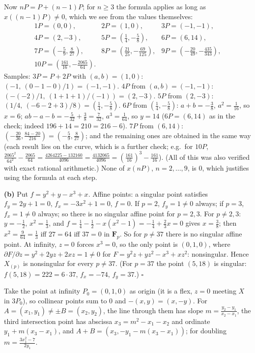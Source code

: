 \documentclass[11pt]{article}
\begin{document}
Now $nP=P+(n-1)P$; for $n\ge3$ the formula applies as long as $x((n-1)P)\neq0$, which we see from the values themselves:
\[
\begin{array}{lll}
1P=(0,0), & 2P=(1,0), & 3P=(-1,-1),\\
4P=(2,-3), & 5P=(\frac14,-\frac58), & 6P=(6,14),\\
7P=(-\frac59,\frac8{27}), & 8P=(\frac{21}{25},-\frac{69}{125}), & 9P=(-\frac{20}{49},-\frac{435}{343}),\\
10P=(\frac{161}{16},-\frac{2065}{64}). & &
\end{array}
\]
Samples: $3P=P+2P$ with $(a,b)=(1,0)$: $(-1,\ (0-1-0)/1)=(-1,-1)$. $4P$ from $(a,b)=(-1,-1)$: $(-(-2)/1,\ (1+1+1)/(-1))=(2,-3)$. $5P$ from $(2,-3)$: $(1/4,\ (-6-2+3)/8)=(\frac14,-\frac58)$. $6P$ from $(\frac14,-\frac58)$: $a+b=-\frac38$, $a^2=\frac1{16}$, so $x=6$; $ab-a-b=-\frac5{32}+\frac38=\frac7{32}$, $a^3=\frac1{64}$, so $y=14$ ($6P=(6,14)$ as in the check; indeed $196+14=210=216-6$). $7P$ from $(6,14)$: $(-\frac{20}{36},\frac{84-20}{216})=(-\frac59,\frac8{27})$; and the remaining ones are obtained in the same way (each result lies on the curve, which is a further check; e.g.\ for $10P$, $\frac{2065^2}{64^2}-\frac{2065}{64}=\frac{4264225-132160}{4096}=\frac{4132065}{4096}=\left(\frac{161}{16}\right)^3-\frac{161}{16}$). (All of this was also verified with exact rational arithmetic.) None of $x(nP)$, $n=2,\ldots,9$, is $0$, which justifies using the formula at each step.

\textbf{(b)} Put $f=y^2+y-x^3+x$. Affine points: a singular point satisfies $f_y=2y+1=0$, $f_x=-3x^2+1=0$, $f=0$. If $p=2$, $f_y=1\ne0$ always; if $p=3$, $f_x=1\neq0$ always; so there is no singular affine point for $p=2,3$. For $p\ne2,3$: $y=-\frac12$, $x^2=\frac13$, and $f=\frac14-\frac12-x(x^2-1)=-\frac14+\frac23x=0$ gives $x=\frac38$; then $x^2=\frac9{64}=\frac13$ iff $27=64$ iff $37=0$ in $\mathbf F_p$. So for $p\neq37$ there is no singular affine point. At infinity, $z=0$ forces $x^3=0$, so the only point is $(0,1,0)$, where $\partial F/\partial z=y^2+2yz+2xz=1\neq0$ for $F=y^2z+yz^2-x^3+xz^2$: nonsingular. Hence $X_{(p)}$ is nonsingular for every $p\ne37$. (For $p=37$ the point $(5,18)$ is singular: $f(5,18)=222=6\cdot37$, $f_x=-74$, $f_y=37$.) \hfill$\square$

\pf
Take the point at infinity $P_0=(0,1,0)$ as origin (it is a flex, $z=0$ meeting $X$ in $3P_0$), so collinear points sum to $0$ and $-(x,y)=(x,-y)$. For $A=(x_1,y_1)\ne\pm B=(x_2,y_2)$, the line through them has slope $m=\frac{y_2-y_1}{x_2-x_1}$, the third intersection point has abscissa $x_3=m^2-x_1-x_2$ and ordinate $y_1+m(x_3-x_1)$, and $A+B=(x_3,-y_1-m(x_3-x_1))$; for doubling $m=\frac{3x_1^2-7}{2y_1}$.
\end{document}
